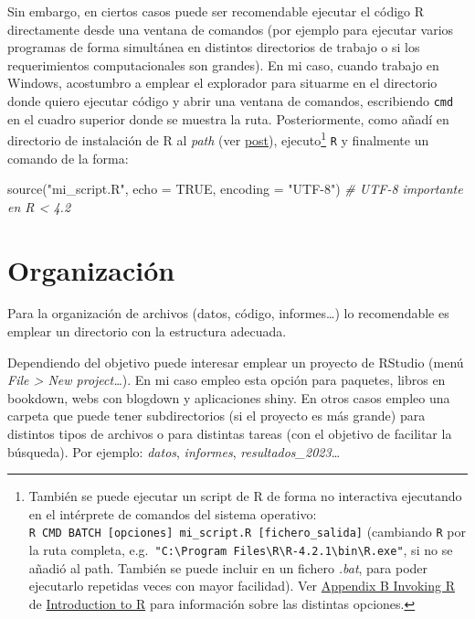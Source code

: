 \documentclass[
]{book}
\newenvironment{Shaded}{\begin{snugshade}}{\end{snugshade}}
\newcommand{\AttributeTok}[1]{\textcolor[rgb]{0.77,0.63,0.00}{#1}}
\newcommand{\CommentTok}[1]{\textcolor[rgb]{0.56,0.35,0.01}{\textit{#1}}}
\newcommand{\ConstantTok}[1]{\textcolor[rgb]{0.00,0.00,0.00}{#1}}
\newcommand{\FunctionTok}[1]{\textcolor[rgb]{0.00,0.00,0.00}{#1}}
\newcommand{\NormalTok}[1]{#1}
\newcommand{\StringTok}[1]{\textcolor[rgb]{0.31,0.60,0.02}{#1}}
\theoremstyle{break}
\theoremstyle{nonumberplain}
\begin{document}
Sin embargo, en ciertos casos puede ser recomendable ejecutar el código R directamente desde una ventana de comandos (por ejemplo para ejecutar varios programas de forma simultánea en distintos directorios de trabajo o si los requerimientos computacionales son grandes).
En mi caso, cuando trabajo en Windows, acostumbro a emplear el explorador para situarme en el directorio donde quiero ejecutar código y abrir una ventana de comandos, escribiendo \texttt{cmd} en el cuadro superior donde se muestra la ruta.
Posteriormente, como añadí en directorio de instalación de R al \emph{path} (ver \href{https://rubenfcasal.github.io/post/instalacion-de-r/\#rtools}{post}), ejecuto\footnote{También se puede ejecutar un script de R de forma no interactiva ejecutando en el intérprete de comandos del sistema operativo: \texttt{R\ CMD\ BATCH\ {[}opciones{]}\ mi\_script.R\ {[}fichero\_salida{]}} (cambiando \texttt{R} por la ruta completa, e.g.~\texttt{"C:\textbackslash{}Program\ Files\textbackslash{}R\textbackslash{}R-4.2.1\textbackslash{}bin\textbackslash{}R.exe"}, si no se añadió al path. También se puede incluir en un fichero \emph{.bat}, para poder ejecutarlo repetidas veces con mayor facilidad). Ver \href{https://cran.r-project.org/doc/manuals/r-release/R-intro.html\#Invoking-R}{Appendix B Invoking R} de \href{https://cran.r-project.org/doc/manuals/r-release/R-intro.html}{Introduction to R} para información sobre las distintas opciones.} \texttt{R} y finalmente un comando de la forma:

\begin{Shaded}
\begin{Highlighting}[]
\FunctionTok{source}\NormalTok{(}\StringTok{"mi\_script.R"}\NormalTok{, }\AttributeTok{echo =} \ConstantTok{TRUE}\NormalTok{, }\AttributeTok{encoding =} \StringTok{"UTF{-}8"}\NormalTok{) }\CommentTok{\# UTF{-}8 importante en R \textless{} 4.2}
\end{Highlighting}
\end{Shaded}

\hypertarget{organizacion}{%
\section{Organización}\label{organizacion}}

Para la organización de archivos (datos, código, informes\ldots) lo recomendable es emplear un directorio con la estructura adecuada.

Dependiendo del objetivo puede interesar emplear un proyecto de RStudio (menú \emph{File \textgreater{} New project\ldots{}}).
En mi caso empleo esta opción para paquetes, libros en bookdown, webs con blogdown y aplicaciones shiny.
En otros casos empleo una carpeta que puede tener subdirectorios (si el proyecto es más grande) para distintos tipos de archivos o para distintas tareas (con el objetivo de facilitar la búsqueda).
Por ejemplo: \emph{datos}, \emph{informes}, \emph{resultados\_2023}\ldots{}
\end{document}

